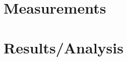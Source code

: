 \documentclass[12pt,titlepage,final]{article}
\begin{document}

\section{Measurements}

\section{Results/Analysis}
\end{document}
